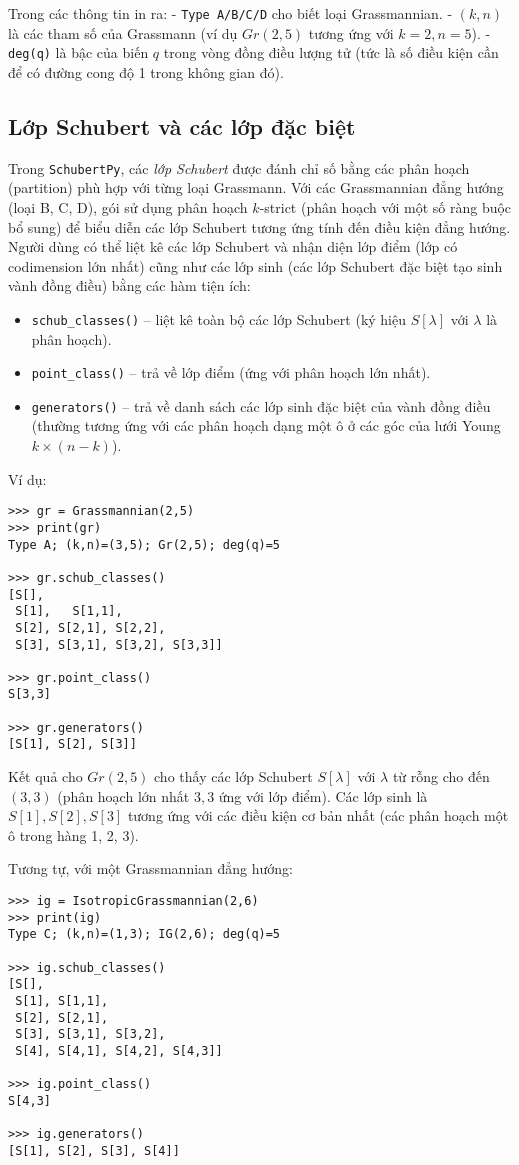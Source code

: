 Trong các thông tin in ra:
- \texttt{Type A/B/C/D} cho biết loại Grassmannian.
- $(k,n)$ là các tham số của Grassmann (ví dụ $Gr(2,5)$ tương ứng với $k=2, n=5$).
- \texttt{deg(q)} là bậc của biến $q$ trong vòng đồng điều lượng tử (tức là số điều kiện cần để có đường cong độ 1 trong không gian đó).

\subsection{Lớp Schubert và các lớp đặc biệt}
Trong \texttt{SchubertPy}, các \textit{lớp Schubert} được đánh chỉ số bằng các phân hoạch (partition) phù hợp với từng loại Grassmann. Với các Grassmannian đẳng hướng (loại B, C, D), gói sử dụng phân hoạch $k$-strict (phân hoạch với một số ràng buộc bổ sung) để biểu diễn các lớp Schubert tương ứng tính đến điều kiện đẳng hướng. Người dùng có thể liệt kê các lớp Schubert và nhận diện lớp điểm (lớp có codimension lớn nhất) cũng như các lớp sinh (các lớp Schubert đặc biệt tạo sinh vành đồng điều) bằng các hàm tiện ích:
\begin{itemize}
    \item \texttt{schub\_classes()} – liệt kê toàn bộ các lớp Schubert (ký hiệu $S[\lambda]$ với $\lambda$ là phân hoạch).
    \item \texttt{point\_class()} – trả về lớp điểm (ứng với phân hoạch lớn nhất).
    \item \texttt{generators()} – trả về danh sách các lớp sinh đặc biệt của vành đồng điều (thường tương ứng với các phân hoạch dạng một ô ở các góc của lưới Young $k \times (n-k)$).
\end{itemize}

Ví dụ:
\small
\begin{verbatim}
>>> gr = Grassmannian(2,5)
>>> print(gr)
Type A; (k,n)=(3,5); Gr(2,5); deg(q)=5

>>> gr.schub_classes()
[S[],
 S[1],   S[1,1],
 S[2], S[2,1], S[2,2],
 S[3], S[3,1], S[3,2], S[3,3]]

>>> gr.point_class()
S[3,3]

>>> gr.generators()
[S[1], S[2], S[3]]
\end{verbatim}
\normalsize

Kết quả cho $Gr(2,5)$ cho thấy các lớp Schubert $S[\lambda]$ với $\lambda$ từ rỗng cho đến $(3,3)$ (phân hoạch lớn nhất $3,3$ ứng với lớp điểm). Các lớp sinh là $S[1], S[2], S[3]$ tương ứng với các điều kiện cơ bản nhất (các phân hoạch một ô trong hàng 1, 2, 3).

Tương tự, với một Grassmannian đẳng hướng:
\small
\begin{verbatim}
>>> ig = IsotropicGrassmannian(2,6)
>>> print(ig)
Type C; (k,n)=(1,3); IG(2,6); deg(q)=5

>>> ig.schub_classes()
[S[],
 S[1], S[1,1],
 S[2], S[2,1],
 S[3], S[3,1], S[3,2],
 S[4], S[4,1], S[4,2], S[4,3]]

>>> ig.point_class()
S[4,3]

>>> ig.generators()
[S[1], S[2], S[3], S[4]]
\end{verbatim}
\normalsize

